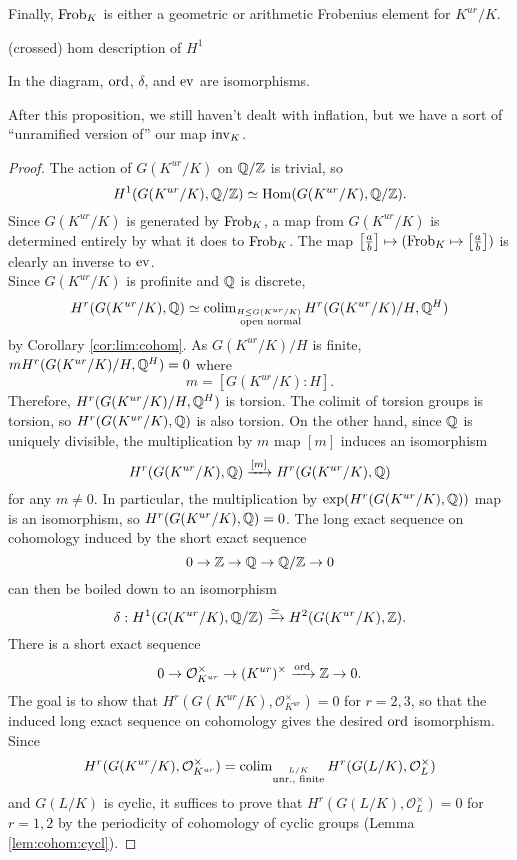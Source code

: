 \documentclass[class=article, crop=false]{standalone}
\begin{document}
Finally, $\operatorname{Frob}_K$ is 
either a geometric or arithmetic Frobenius element for $K^{ur}/K$.

{\color{red} (crossed) hom description of \(H^{1}\) }

\begin{proposition}
	In the diagram, $\operatorname{ord}$, $\delta$, and $\operatorname{ev}$ are isomorphisms.
\end{proposition}

After this proposition, we still haven't dealt with inflation,
but we have a sort of ``unramified version of'' our map \(\operatorname{inv}_{K}\). 

\begin{proof}
	The action of $G(K^{ur}/K)$ on $\mathbb{Q}/\mathbb{Z}$ is trivial, so
	\[
	H^{1}(G(K^{ur}/K),\mathbb{Q}/\mathbb{Z})\simeq\operatorname{Hom}(G(K^{ur}/K),\mathbb{Q}/\mathbb{Z})
	.\] 
	Since $G(K^{ur}/K)$ is generated by $\operatorname{Frob}_K$, a map from $G(K^{ur}/K)$ is determined entirely by what it does to $\operatorname{Frob}_K$. The map $\left[\frac{a}{b}\right]\mapsto(\operatorname{Frob}_K\mapsto\left[\frac{a}{b}\right])$ is clearly an inverse to $\operatorname{ev}$.\\
	Since $G(K^{ur}/K)$ is profinite and $\mathbb{Q}$ is discrete,
	\[
		H^{r}(G(K^{ur}/K),\mathbb{Q})\simeq\operatorname{colim}_{\stackrel{H\le G(K^{ur}/K)}{\text{ open normal}}}H^{r}(G(K^{ur}/K)/H,\mathbb{Q}^{H})
	\] 
	by Corollary \ref{cor:lim:cohom}.
	As $G(K^{ur}/K)/H$ is finite, $mH^{r}(G(K^{ur}/K)/H,\mathbb{Q}^{H})=0$ where
	\[
	m=[G(K^{ur}/K):H]
	.\] 
	Therefore, $H^{r}(G(K^{ur}/K)/H,\mathbb{Q}^{H})$ is torsion. 
	The colimit of torsion groups is torsion, 
	so $H^{r}(G(K^{ur}/K),\mathbb{Q})$ is also torsion. 
	On the other hand, since $\mathbb{Q}$ is uniquely divisible, the multiplication by $m$ map $[m]$ induces an isomorphism
	\[
		H^{r}(G(K^{ur}/K),\mathbb{Q})\xrightarrow{[m]}H^{r}(G(K^{ur}/K),\mathbb{Q})
	\] 
	for any $m\ne 0$. In particular, the multiplication by $\exp(H^{r}(G(K^{ur}/K),\mathbb{Q}))$  map is an isomorphism, so $H^{r}(G(K^{ur}/K),\mathbb{Q})=0$. The long exact sequence on cohomology induced by the short exact sequence
	\[
		0\to\mathbb{Z}\to\mathbb{Q}\to\mathbb{Q}/\mathbb{Z}\to 0
	\] 
	can then be boiled down to an isomorphism
	\[
		\delta:H^{1}(G(K^{ur}/K),\mathbb{Q}/\mathbb{Z})\xrightarrow{\simeq}H^{2}(G(K^{ur}/K),\mathbb{Z})
	.\] 
	There is a short exact sequence
	\[
		0\to\mathcal{O}_{K^{ur}}^{\times}\to(K^{ur})^{\times}\xrightarrow{\operatorname{ord}}\mathbb{Z}\to 0
	.\] 
	The goal is to show that $H^{r}(G(K^{ur}/K),\mathcal{O}_{K^{ur}}^{\times})=0$ for $r=2,3$, so that the induced long exact sequence on cohomology gives the desired $\operatorname{ord}$ isomorphism. Since
	\[
		H^{r}(G(K^{ur}/K),\mathcal{O}_{K^{ur}}^{\times})=\operatorname{colim}_{\stackrel{L/K}{\text{unr., finite}}}H^{r}(G(L/K),\mathcal{O}_L^{\times})
	\] 
	and $G(L/K)$ is cyclic, 
	it suffices to prove that 
	$H^{r}(G(L/K),\mathcal{O}_L^{\times})=0$ 
	for $r=1,2$ by the periodicity of cohomology of cyclic groups
	(Lemma \ref{lem:cohom:cycl}).


\end{proof}
\end{document}
